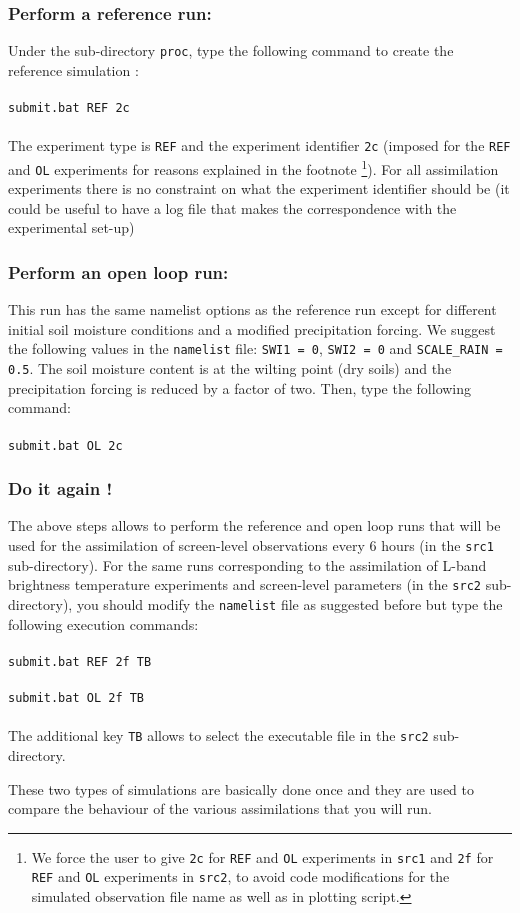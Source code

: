 \documentclass[12pt]{article}
\begin{document}
\subsubsection{Perform a reference run:}
Under the sub-directory {\tt proc}, type the following command to create the reference simulation :
\\
\\
{\tt submit.bat REF 2c}
\\
\\
The experiment type is {\tt REF} and the
experiment identifier {\tt 2c} (imposed for the {\tt REF} and {\tt OL} experiments
for reasons explained in the footnote
\footnote{We force the user 
to give {\tt 2c} for {\tt REF} and {\tt OL} experiments in {\tt src1} and {\tt 2f} for
{\tt REF} and {\tt OL} experiments in {\tt src2}, to avoid code modifications for the simulated observation
file name as well as in plotting script.}). For all assimilation experiments
there is no constraint on what the experiment identifier should be (it could be useful to have a log
file that makes the correspondence with the experimental set-up) 
\subsubsection{Perform an open loop run:} This run has the same namelist options
as the reference run except for different initial soil moisture conditions and a
modified precipitation forcing. We suggest the following values in the {\tt namelist} file:
{\tt SWI1 = 0}, {\tt SWI2 = 0}
and {\tt SCALE\_RAIN = 0.5}. The soil moisture content is at the wilting point (dry soils)
and the precipitation forcing is reduced by a factor of two. Then, type the following command: 
\\
\\
{\tt submit.bat OL 2c}
\subsubsection{Do it again !}The above steps allows to perform the reference and open loop runs that will
be used for the
assimilation of screen-level observations every 6 hours (in the {\tt src1} sub-directory).
For the same runs corresponding to the assimilation of L-band brightness temperature experiments
and screen-level parameters (in the {\tt src2} sub-directory), you should modify the {\tt namelist} file as
suggested before but type the following execution commands:
\\
\\
{\tt submit.bat REF 2f TB}
\\
\\
{\tt submit.bat OL 2f TB}
\\
\\
The additional key {\tt TB} allows to select the executable file in the {\tt src2} sub-directory.
\par
\vspace{0.5cm}
These two types of simulations are basically done once and they are used
to compare the behaviour of the various assimilations that you will run.
\end{document}
